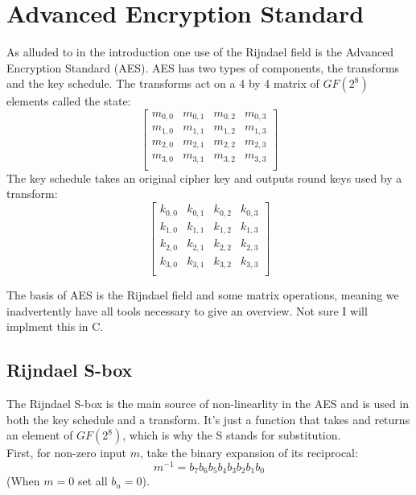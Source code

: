 
\chapter{Advanced Encryption Standard}
As alluded to in the introduction one use of the Rijndael field is the Advanced Encryption Standard (AES).
AES has two types of components,
the transforms and the key schedule.
The transforms act on a 4 by 4 matrix of $GF(2^8)$ elements called the state:
\[
\begin{bmatrix}
	m_{0,0}&m_{0,1}&m_{0,2}&m_{0,3}\\
	m_{1,0}&m_{1,1}&m_{1,2}&m_{1,3}\\
	m_{2,0}&m_{2,1}&m_{2,2}&m_{2,3}\\
	m_{3,0}&m_{3,1}&m_{3,2}&m_{3,3}\\
\end{bmatrix}
\]
The key schedule takes an original cipher key and outputs round keys used by a transform:
\[
\begin{bmatrix}
	k_{0,0}&k_{0,1}&k_{0,2}&k_{0,3}\\
	k_{1,0}&k_{1,1}&k_{1,2}&k_{1,3}\\
	k_{2,0}&k_{2,1}&k_{2,2}&k_{2,3}\\
	k_{3,0}&k_{3,1}&k_{3,2}&k_{3,3}\\
\end{bmatrix}
\]

The basis of AES is the Rijndael field and some matrix operations,
meaning we inadvertently have all tools necessary to give an overview.
Not sure I will implment this in C.

\section{Rijndael S-box}
The Rijndael S-box is the main source of non-linearlity in the AES and is used in both the key schedule and a transform.
It's just a function that takes and returns an element of $GF(2^8)$,
which is why the S stands for substitution.
\\

First,
for non-zero input $m$,
take the binary expansion of its reciprocal:
\[m^{-1}=b_7b_6b_5b_4b_3b_2b_1b_0\]
(When $m=0$ set all $b_n=0$).
\\

